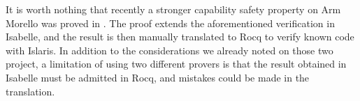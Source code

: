 It is worth nothing that recently a stronger capability safety property on Arm Morello was proved in \cite{Hammond2025}. The proof extends the aforementioned verification in Isabelle, and the result is then manually translated to Rocq to verify known code with Islaris. In addition to the considerations we already noted on those two project, a limitation of using two different provers is that the result obtained in Isabelle must be admitted in Rocq, and mistakes could be made in the translation.

